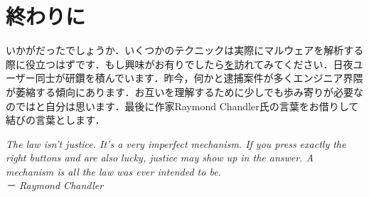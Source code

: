 \section{終わりに}
いかがだったでしょうか．いくつかのテクニックは実際にマルウェアを解析する際に役立つはずです．もし興味がお有りでしたら\href{https://crackmes.one/}を訪れてみてください．日夜ユーザー同士が研鑽を積んでいます．昨今，何かと逮捕案件が多くエンジニア界隈が萎縮する傾向にあります．お互いを理解するために少しでも歩み寄りが必要なのではと自分は思います．最後に作家Raymond Chandler氏の言葉をお借りして結びの言葉とします．



\textit{The law isn’t justice. It’s a very imperfect mechanism. If you press exactly the right buttons and are also lucky, justice may show up in the answer. A mechanism is all the law was ever intended to be.\\
－ Raymond Chandler}
